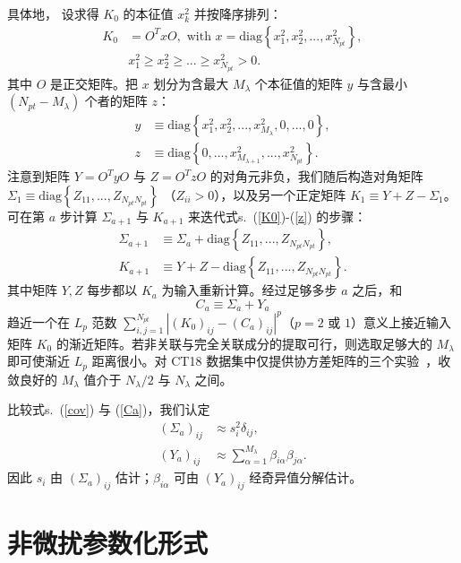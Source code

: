 具体地，
设求得 $K_{0}$ 的本征值 $x_{k}^{2}$ 并按降序排列：
\begin{align}
K_{0} & =O^{T}xO,\mbox{ with }x=\mbox{diag}\left\{ x_{1}^{2},x_{2}^{2},...,x_{N_{pt}}^{2}\right\} ,\label{K0}\\
 & x_{1}^{2}\geq x_{2}^{2}\geq...\geq x_{N_{pt}}^{2}>0.
\end{align}
其中 $O$ 是正交矩阵。把 $x$ 划分为含最大 $M_{\lambda}$
个本征值的矩阵 $y$ 与含最小 $(N_{pt}-M_{\lambda})$
个者的矩阵 $z$：
\begin{align}
y & \equiv\mbox{diag}\left\{ x_{1}^{2},x_{2}^{2},...,x_{M_{\lambda}}^{2},0,...,0\right\} ,\\
z & \equiv\mbox{diag}\left\{ 0,...,x_{M_{\lambda+1}}^{2},...,x_{N_{pt}}^{2}\right\} .\label{z}
\end{align}
注意到矩阵 $Y=O^{T}yO$ 与
$Z=O^{T}zO$ 的对角元非负，我们随后构造对角矩阵
$\Sigma_{1}\equiv\mbox{diag}\left\{ Z_{11},...,Z_{N_{pt}N_{pt}}\right\} $
（$Z_{ii}>0$），以及另一个正定矩阵 $K_{1}\equiv Y+Z-\Sigma_{1}$。
可在第 $a$ 步计算 $\Sigma_{a+1}$ 与 $K_{a+1}$ 来迭代式s.~(\ref{K0})-(\ref{z}) 的步骤：
\begin{align}
\Sigma_{a+1} & \equiv\Sigma_{a}+\mbox{diag}\left\{ Z_{11},...,Z_{N_{pt}N_{pt}}\right\} ,\\
K_{a+1} & \equiv Y+Z-\mbox{diag}\left\{ Z_{11},...,Z_{N_{pt}N_{pt}}\right\} .
\end{align}
其中矩阵 $Y,Z$ 每步都以 $K_{a}$ 为输入重新计算。经过足够多步 $a$ 之后，和
\begin{equation}
C_{a}\equiv\Sigma_{a}+Y_{a}\label{Ca}
\end{equation}
趋近一个在 $L_{p}$ 范数 $\sum_{i,j=1}^{N_{pt}}\left|(K_{0})_{ij}-(C_{a})_{ij}\right|^{p}$（$p=2$ 或 $1$）意义上接近输入矩阵
$K_{0}$ 的渐近矩阵。若非关联与完全关联成分的提取可行，则选取足够大的 $M_{\lambda}$ 即可使渐近 $L_{p}$ 距离很小。对 CT18 数据集中仅提供协方差矩阵的三个实验~\cite{Aaij:2015gna,Aaij:2015zlq,Khachatryan:2016pev}，收敛良好的 $M_\lambda$ 值介于 $N_{\lambda}/2$ 与 $N_{\lambda}$ 之间。

比较式s.~(\ref{cov}) 与 (\ref{Ca})，我们认定
\begin{align}
(\Sigma_{a})_{ij} & \approx s_{i}^{2}\delta_{ij},\\
(Y_{a})_{ij} & \approx\sum_{\alpha=1}^{M_{\lambda}}\beta_{i\alpha}\beta_{j\alpha}.
\end{align}
因此 $s_i$ 由 $(\Sigma_a)_{ij}$ 估计；$\beta_{i\alpha}$ 可由 $(Y_{a})_{ij}$ 经奇异值分解估计。


\section{非微扰参数化形式}
\label{sec:AppendixParam}

